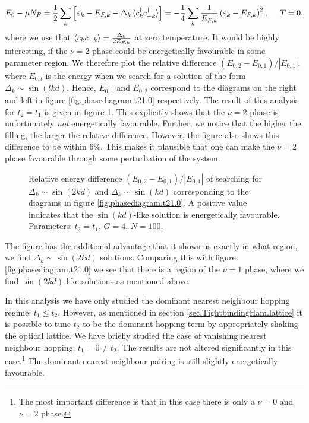 \begin{equation}
E_0 - \mu N_F = \frac{1}{2}\sum_k \left[\varepsilon_k - E_{F,k} - \Delta_k\braket{c^\dagger_{k}c^\dagger_{-k}}\right] = -\frac{1}{4}\sum_k \frac{1}{E_{F,k}}\left( \varepsilon_k - E_{F,k} \right)^2, \hspace{0.5cm} T = 0, 
\label{eq.groundstategrandenergy.sumformula}
\end{equation}
where we use that $\braket{c_kc_{-k}} = \frac{\Delta_k}{2E_{F,k}}$ at zero temperature. It would be highly interesting, if the $\nu = 2$ phase could be energetically favourable in some parameter region. We therefore plot the relative difference $(E_{0,2} - E_{0,1})/|E_{0,1}|$, where $E_{0,l}$ is the energy when we search for a solution of the form $\Delta_k \sim \sin(lkd)$. Hence, $E_{0,1}$ and $E_{0,2}$ correspond to the diagrams on the right and left in figure \ref{fig.phasediagram.t21.0} respectively. The result of this analysis for $t_2 = t_1$ is given in figure \ref{fig.energydifference.t21.0}. This explicitly shows that the $\nu = 2$ phase is unfortunately \textit{not} energetically favourable. Further, we notice that the higher the filling, the larger the relative difference. However, the figure also shows this difference to be within $6\%$. This makes it plausible that one can make the $\nu = 2$ phase favourable through some perturbation of the system.   

\begin{figure}
\begin{center}

\caption{Relative energy difference $(E_{0,2} - E_{0,1})/|E_{0,1}|$ of searching for $\Delta_k \sim \sin(2kd)$ and $\Delta_k\sim \sin(kd)$ corresponding to the diagrams in figure \ref{fig.phasediagram.t21.0}. A positive value indicates that the $\sin(kd)$-like solution is energetically favourable. Parameters: $t_2 = t_1$, $G = 4$, $N = 100$. }
\label{fig.energydifference.t21.0}
\end{center}
\end{figure}

The figure has the additional advantage that it shows us exactly in what region, we find $\Delta_k \sim \sin(2kd)$ solutions. Comparing this with figure \ref{fig.phasediagram.t21.0} we see that there is a region of the $\nu = 1$ phase, where we find $\sin(2kd)$-like solutions as mentioned above. 

In this analysis we have only studied the dominant nearest neighbour hopping regime: $t_1 \leq t_2$. However, as mentioned in section \ref{sec.TightbindingHam.lattice} it is possible to tune $t_2$ to be the dominant hopping term by appropriately shaking the optical lattice. We have briefly studied the case of vanishing nearest neighbour hopping, $t_1 = 0 \neq t_2$. The results are not altered significantly in this case.\footnote{The most important difference is that in this case there is only a $\nu = 0$ and $\nu = 2$ phase.} The dominant nearest neighbour pairing is still slightly energetically favourable.

